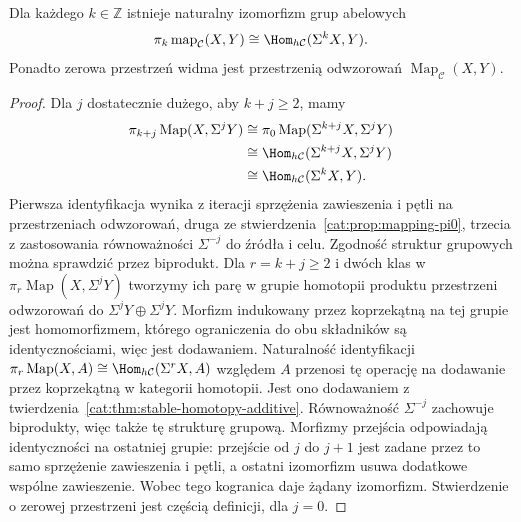 \begin{stwierdzenie}\label{cat:prop:stable-mapping-spectrum-groups}
Dla każdego $k\in\mathbb Z$ istnieje naturalny izomorfizm grup abelowych
\[
 \pi_k\operatorname{map}_{\mathcal C}(X,Y)
 \cong\Hom_{h\mathcal C}(\Sigma^kX,Y).
\]
Ponadto zerowa przestrzeń widma jest przestrzenią odwzorowań $\operatorname{Map}_{\mathcal C}(X,Y)$.
\end{stwierdzenie}
\begin{proof}
Dla $j$ dostatecznie dużego, aby $k+j\geq2$, mamy
\[
\begin{aligned}
 \pi_{k+j}\operatorname{Map}(X,\Sigma^jY)
 &\cong\pi_0\operatorname{Map}(\Sigma^{k+j}X,\Sigma^jY)\\
 &\cong\Hom_{h\mathcal C}(\Sigma^{k+j}X,\Sigma^jY)\\
 &\cong\Hom_{h\mathcal C}(\Sigma^kX,Y).
\end{aligned}
\]
Pierwsza identyfikacja wynika z iteracji sprzężenia zawieszenia i pętli na przestrzeniach odwzorowań, druga ze stwierdzenia~\ref{cat:prop:mapping-pi0}, trzecia z zastosowania równoważności $\Sigma^{-j}$ do źródła i celu. Zgodność struktur grupowych można sprawdzić przez biprodukt. Dla $r=k+j\geq2$ i dwóch klas w $\pi_r\operatorname{Map}(X,\Sigma^jY)$ tworzymy ich parę w grupie homotopii produktu przestrzeni odwzorowań do $\Sigma^jY\oplus\Sigma^jY$. Morfizm indukowany przez koprzekątną na tej grupie jest homomorfizmem, którego ograniczenia do obu składników są identycznościami, więc jest dodawaniem. Naturalność identyfikacji $\pi_r\operatorname{Map}(X,A)\cong\Hom_{h\mathcal C}(\Sigma^rX,A)$ względem $A$ przenosi tę operację na dodawanie przez koprzekątną w kategorii homotopii. Jest ono dodawaniem z twierdzenia~\ref{cat:thm:stable-homotopy-additive}. Równoważność $\Sigma^{-j}$ zachowuje biprodukty, więc także tę strukturę grupową. Morfizmy przejścia odpowiadają identyczności na ostatniej grupie: przejście od $j$ do $j+1$ jest zadane przez to samo sprzężenie zawieszenia i pętli, a ostatni izomorfizm usuwa dodatkowe wspólne zawieszenie. Wobec tego kogranica daje żądany izomorfizm. Stwierdzenie o zerowej przestrzeni jest częścią definicji, dla $j=0$.
\end{proof}

